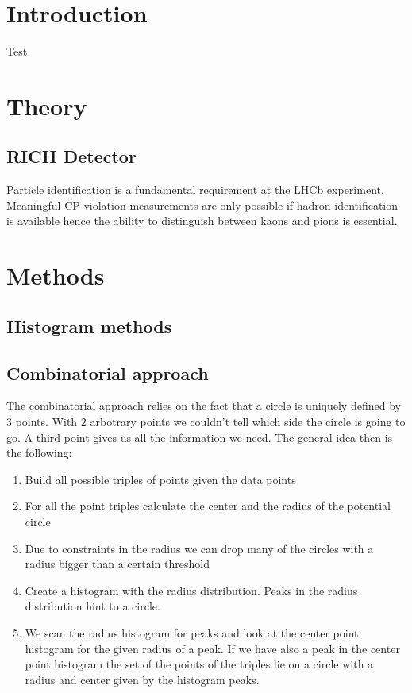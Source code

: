 \documentclass[10pt,twoside]{scrreprt}
\begin{document}
\chapter{Introduction}
Test

\chapter{Theory}

\section{RICH Detector} %
\label{sec:rich_detector}

Particle identification is a fundamental requirement at the LHCb experiment. Meaningful CP-violation measurements are only possible if hadron identification is available hence the ability to distinguish between kaons and pions is  essential.


\chapter{Methods}

\section{Histogram methods}

\section{Combinatorial approach}

The combinatorial approach relies on the fact that a circle is uniquely defined by 3 points. With 2 arbotrary points we couldn't tell which side the circle is
going to go. A third point gives us all the information we need. The general idea then is the following:

\begin{enumerate}
\item Build all possible triples of points given the data points
\item For all the point triples calculate the center and the radius of the potential circle
\item Due to constraints in the radius we can drop many of the circles with a radius bigger than a certain threshold
\item Create a histogram with the radius distribution. Peaks in the radius distribution hint to a circle.
\item We scan the radius histogram for peaks and look at the center point histogram for the given radius of a peak. If we have also a peak in the center point histogram
      the set of the points of the triples lie on a circle with a radius and center given by the histogram peaks.
\end{enumerate}
\end{document}
